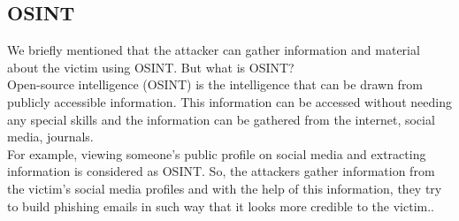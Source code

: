 \subsection{OSINT}
We briefly mentioned that the attacker can gather information and material about the victim using OSINT. But what is OSINT? \\ 
Open-source intelligence (OSINT) is the intelligence that can be drawn from publicly accessible information. This information can be accessed without needing any special skills and the information can be gathered from the internet, social media, journals. \\
For example, viewing someone's public profile on social media and extracting information is considered as OSINT. So, the attackers gather information from the victim's social media profiles and with the help of this information, they try to build phishing emails in such way that it looks more credible to the victim..